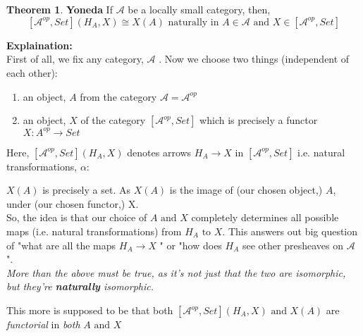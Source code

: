 \documentclass[18pt,a4paper]{extarticle}
\theoremstyle{definition}
\newtheorem{theorem}{Theorem}[section]
\theoremstyle{definition}
\begin{document}
\section{}
\begin{theorem}{\textbf{Yoneda}} %
	If $\mathcal{A} $ be a locally small category, then, \\
	\[ [ \mathcal{A} ^{op},Set ](H_A,X) \cong X(A) \text{ naturally in } A \in \mathcal{A} \text{ and }
	X \in [ \mathcal{A}^{op},Set]\]
\end{theorem}
\textbf{Explaination:} \\
First of all, we fix any category, $\mathcal{A} $ . Now we choose two things (independent of each other):
\begin{enumerate}[label=\roman*]
	\item an object, $A$ from the category $ \mathcal{A}= \mathcal{A} ^{op} $
	\item an object, $X$ of the category $[ \mathcal{A}^{op},Set] $
		which is precisely a functor $X: A^{op} \rightarrow Set$
\end{enumerate}
Here, $[ \mathcal{A}^{op},Set](	H_A,X) $ denotes arrows $H_A \rightarrow X$ in $[ \mathcal{A}^{op},Set] $
i.e. natural transformations, $\alpha :$
$X(A)$ is precisely a set. As $X(A)$ is the image of (our chosen object,) $A$, under (our chosen functor,) X. \\

So, the idea is that our choice of $A \text{ and } X$ completely determines all possible maps
(i.e. natural transformations) from $H_A \text{ to } X$. This answers out big question of "what are all the maps
$H_A  \rightarrow X$ " or "how does $H_A$ see other presheaves on $\mathcal{A} $ ".\\

\textit{More than the above must be true, as it's not just that the two are isomorphic, but they're \textbf{naturally} isomorphic.}

This more is supposed to be that both $[ \mathcal{A}^{op},Set](H_A,X) \text{ and } X(A)$ are
\textit{functorial} in \textit{both} $A \text{ and } X$
\end{document}

